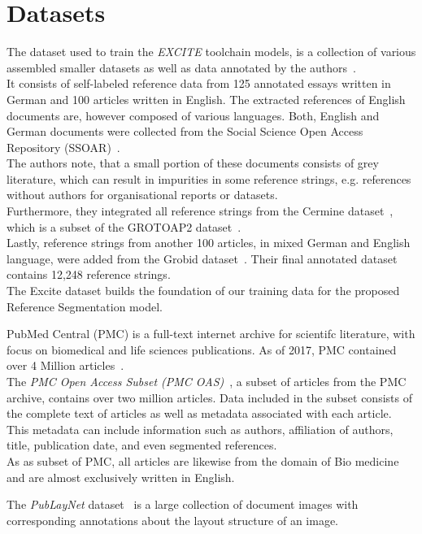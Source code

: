 \section{Datasets}
The dataset used to train the \textit{EXCITE} toolchain models, is a collection of various assembled smaller datasets as well as data annotated by the authors~\cite{excite_methods}.\\
It consists of self-labeled reference data from 125 annotated essays written in German and 100 articles written in English. The extracted references of English documents are, however composed of various languages. Both, English and German documents were collected from the Social Science Open Access Repository (SSOAR)~\cite{noauthor_ssoar_nodate}.\\
The authors note, that a small portion of these documents consists of grey literature, which can result in impurities in some reference strings, e.g. references without authors for organisational reports or datasets.\\
Furthermore, they integrated all reference strings from the Cermine dataset~\cite{tkaczyk2015cermine}, which is a subset of the GROTOAP2 dataset~\cite{tkaczyk2014grotoap2}.\\
Lastly, reference strings from another 100 articles, in mixed German and English language, were added from the Grobid dataset~\cite{GROBID_pref}. Their final annotated dataset contains 12,248 reference strings.\\
The Excite dataset builds the foundation of our training data for the proposed Reference Segmentation model.\par
PubMed Central (PMC) is a full-text internet archive for scientifc literature, with focus on biomedical and life sciences publications. As of 2017, PMC contained over 4 Million articles~\cite{gamble2017pubmed}.\\
The \textit{PMC Open Access Subset (PMC OAS)}~\cite{pmcoas}, a subset of articles from the PMC archive, contains over two million articles. Data included in the subset consists of the complete text of articles as well as metadata associated with each article.\\
This metadata can include information such as authors, affiliation of authors, title, publication date, and even segmented references.\\
As as subset of PMC, all articles are likewise from the domain of Bio medicine and are almost exclusively written in English.\par
The \textit{PubLayNet} dataset~\cite{zhong2019publaynet} is a large collection of document images with corresponding annotations about the layout structure of an image.\\
